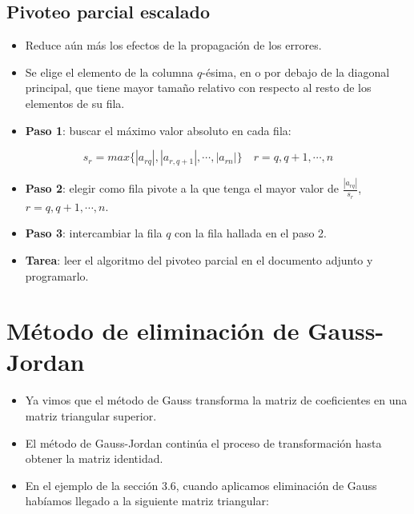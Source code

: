 \documentclass[openany]{book}
\providecommand{\tightlist}{%
  \setlength{\itemsep}{0pt}\setlength{\parskip}{0pt}}
\begin{document}
\hypertarget{pivoteo-parcial-escalado}{%
\subsection{Pivoteo parcial escalado}\label{pivoteo-parcial-escalado}}

\begin{itemize}
\tightlist
\item
  Reduce aún más los efectos de la propagación de los errores.
\item
  Se elige el elemento de la columna \(q\)-ésima, en o por debajo de la diagonal principal, que tiene mayor tamaño relativo con respecto al resto de los elementos de su fila.
\item
  \textbf{Paso 1}: buscar el máximo valor absoluto en cada fila:
\end{itemize}

\[
s_r = max\{|a_{rq}|, |a_{r,q+1}|, \cdots, |a_{rn}| \} \quad r = q, q+1, \cdots, n
\]

\begin{itemize}
\tightlist
\item
  \textbf{Paso 2}: elegir como fila pivote a la que tenga el mayor valor de \(\frac{|a_{rq}|}{s_r}\), \(r = q, q+1, \cdots, n\).
\item
  \textbf{Paso 3}: intercambiar la fila \(q\) con la fila hallada en el paso 2.
\item
  \textbf{Tarea}: leer el algoritmo del pivoteo parcial en el documento adjunto y programarlo.
\end{itemize}

\hypertarget{muxe9todo-de-eliminaciuxf3n-de-gauss-jordan}{%
\section{Método de eliminación de Gauss-Jordan}\label{muxe9todo-de-eliminaciuxf3n-de-gauss-jordan}}

\begin{itemize}
\tightlist
\item
  Ya vimos que el método de Gauss transforma la matriz de coeficientes en una matriz triangular superior.
\item
  El método de Gauss-Jordan continúa el proceso de transformación hasta obtener la matriz identidad.
\item
  En el ejemplo de la sección 3.6, cuando aplicamos eliminación de Gauss habíamos llegado a la siguiente matriz triangular:
\end{itemize}
\end{document}
